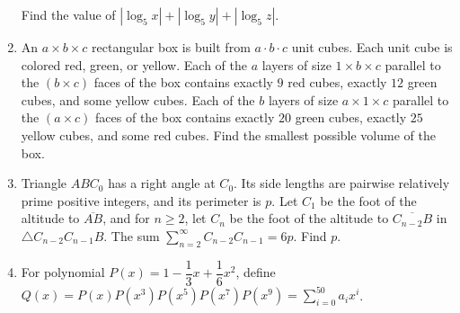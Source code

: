 \documentclass{article}
\begin{document}
\begin{enumerate}[label=\arabic*., itemsep=0.5em]
Find the value of $|\log_5 x|+|\log_5 y|+|\log_5 z|$.\par \vspace{0.5em}\item An $a \times b \times c$ rectangular box is built from $a \cdot b \cdot c$ unit cubes. Each unit cube is colored red, green, or yellow. Each of the $a$ layers of size $1 \times b \times c$ parallel to the $(b \times c)$ faces of the box contains exactly $9$ red cubes, exactly $12$ green cubes, and some yellow cubes. Each of the $b$ layers of size $a \times 1 \times c$ parallel to the $(a \times c)$ faces of the box contains exactly $20$ green cubes, exactly $25$ yellow cubes, and some red cubes. Find the smallest possible volume of the box.\par \vspace{0.5em}\item Triangle $ABC_0$ has a right angle at $C_0$. Its side lengths are pairwise relatively prime positive integers, and its perimeter is $p$. Let $C_1$ be the foot of the altitude to $\overline{AB}$, and for $n \geq 2$, let $C_n$ be the foot of the altitude to $\overline{C_{n-2}B}$ in $\triangle C_{n-2}C_{n-1}B$. The sum $\sum_{n=2}^\infty C_{n-2}C_{n-1} = 6p$. Find $p$.\par \vspace{0.5em}\item For polynomial $P(x)=1-\dfrac{1}{3}x+\dfrac{1}{6}x^{2}$, define
$Q(x)=P(x)P(x^{3})P(x^{5})P(x^{7})P(x^{9})=\sum_{i=0}^{50} a_ix^{i}$.

\end{enumerate}
\end{document}
